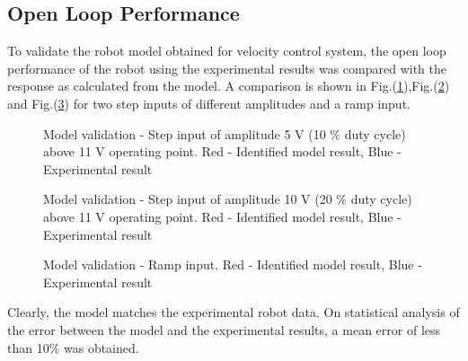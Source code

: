 \documentclass[conference]{IEEEtran}
\begin{document}
\subsection{Open Loop Performance}
To validate the robot model obtained for velocity control system, the open loop performance of the robot using the experimental results was compared with the response as calculated from the model. A comparison is shown in Fig.(\ref{openloop1}),Fig.(\ref{openloop2}) and Fig.(\ref{openloop3}) for two step inputs of different amplitudes and a ramp input. 
\begin{figure}[htbp]

			  \centering
%			  
			  \def\svgscale{0.25}
			  \tiny{
			  }
			  \caption{Model validation - Step input of amplitude 5 V (10 \% duty cycle) above 11 V operating point. Red - Identified model result, Blue - Experimental result}
			 \label{openloop1}
		\end{figure}
	
\begin{figure}[htbp]

			  \centering
%			  
			  \def\svgscale{0.25}
			  \tiny{
			  }
			  \caption{Model validation - Step input of amplitude 10 V (20 \% duty cycle) above 11 V operating point. Red - Identified model result, Blue - Experimental result}
			 \label{openloop2}
		\end{figure}
		\begin{figure}[htbp]

			  \centering
%			  
			  \def\svgscale{0.25}
			  \tiny{
			  }
			  \caption{Model validation - Ramp input. Red - Identified model result, Blue - Experimental result}
			 \label{openloop3}
		\end{figure}

Clearly, the model matches the experimental robot data. On statistical analysis of the error between the model and the experimental results, a mean error of less than 10\% was obtained. 
\end{document}
